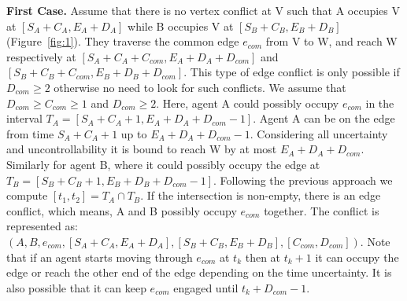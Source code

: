 \documentclass{article}
\begin{document}
\noindent \textbf{First Case.} 
Assume that there is no vertex conflict at V such that A occupies V at $[S_A+C_A,E_A+D_A]$ while B occupies V at $[S_B+C_B,E_B+D_B]$ (Figure~\ref{fig:1}). 
They traverse the common edge $e_{com}$ from V to W, and reach W respectively at $[S_A+C_A+C_{com},E_A+D_A+D_{com}]$ and $[S_B+C_B+C_{com},E_B+D_B+D_{com}]$. 
%
This type of edge conflict is only possible if $D_{com} \geq 2$ otherwise no need to look for such conflicts. 
We assume that $D_{com} \geq C_{com} \geq 1$ and $D_{com} \geq 2$. Here, agent A could possibly occupy $e_{com}$ in the interval $T_A = [S_A+C_A+1,E_A+D_A+D_{com}-1]$.
Agent A can be on the edge from time $S_A+C_A+1$ up to $E_A+D_A+D_{com}-1$.  Considering all uncertainty and uncontrollability it is bound to reach W by at most $E_A+D_A+D_{com}$.
Similarly for agent B, where it could possibly occupy the edge at $T_B = [S_B+C_B+1,E_B+D_B+D_{com}-1]$.
%
Following the previous approach we compute $[t_1,t_2] = T_A \cap T_B$. If the intersection is non-empty, there is an edge conflict, which means,  A and B possibly occupy $e_{com}$ together.
%
The conflict is represented as: $(A,B,e_{com},[S_A+C_A,E_A+D_A],[S_B+C_B,E_B+D_B], [C_{com},D_{com}])$. 
Note that if an agent starts moving through $e_{com}$ at $t_k$ then at $t_{k}+1$ it can occupy the edge or reach the other end of the edge depending on the time uncertainty. 
It is also possible that it can keep $e_{com}$ engaged until $t_k+D_{com}-1$.
\end{document}
